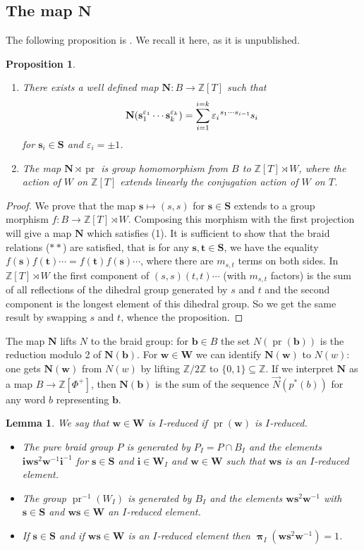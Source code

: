 \documentclass{amsart}
\numberwithin{equation}{section}
\newtheorem{lemma}[equation]{Lemma}
\newtheorem{proposition}[equation]{Proposition}
\newcommand\vN{\vec N}
\newcommand\lexp[2]{\kern\scriptspace\vphantom{#2}^{#1}\kern-\scriptspace#2}
\newcommand\inv{^{-1}}
\newcommand\bb{{\mathbf b}}
\newcommand\bi{{\mathbf i}}
\newcommand\bs{{\mathbf s}}
\newcommand\bt{{\mathbf t}}
\newcommand\bw{{\mathbf w}}
\newcommand\bN{{\mathbf N}}
\newcommand\bS{{\mathbf S}}
\newcommand\bW{{\mathbf W}}
\newcommand\BZ{{\mathbb Z}}
\DeclareMathOperator\pr{pr}
\DeclareMathOperator\bpi{\boldsymbol\pi}
\begin{document}
\subsection*{The map $\bN$}
The following proposition is \cite[Proposition~2.1]{digne}. We recall it here,  as it is unpublished.
\begin{proposition}\label{digne2.1}
\phantom{a}
\begin{enumerate}
\item There exists a well defined map \index{N@$\bN$} $\bN:B\to \BZ[T]$ such that
$$\bN(\bs_1^{\varepsilon_1}\cdots \bs_k^{\varepsilon_k})=\sum_{i=1}^{i=k} \varepsilon_i
\lexp{s_1\cdots s_{i-1}}s_i$$
for $\bs_i\in\bS$ and $\varepsilon_i=\pm1$.
\item The map $\bN\rtimes\pr$ is group homomorphism from $B$ to
$\BZ[T]\rtimes W$, where the action of $W$ on $\BZ[T]$
extends linearly the conjugation action of $W$ on $T$.
\end{enumerate}
\end{proposition}
\begin{proof}
We prove that the map $\bs\mapsto (s,s)$ for $\bs\in\bS$ extends to 
a group morphism $f:B\to \BZ[T]\rtimes W$.
Composing this morphism with the first projection will give a map $\bN$ which satisfies
(1). It is sufficient to show that the braid relations ($**$) are satisfied, that is for any
$\bs,\bt\in\bS$, we have the equality $f(\bs)f(\bt)\cdots=f(\bt)f(\bs)\cdots$, where there
are $m_{s,t}$ terms on both sides. In $\BZ[T]\rtimes W$ the first component of
$(s,s)(t,t)\cdots$ (with $m_{s,t}$ factors) is the sum of all reflections of the dihedral
group generated by $s$ and $t$ and the second component is the longest element of this
dihedral group. So we get the same result by swapping $s$ and $t$, whence the
proposition.
\end{proof}
The map $\bN$ lifts $N$ to the braid group:
for $\bb\in B$ the set $N(\pr(\bb))$
is the reduction modulo 2 of $\bN(\bb)$.
For $\bw\in\bW$ we can
identify $\bN(\bw)$ to $N(w)$:
one gets $\bN(\bw)$ from $N(w)$ by lifting $\BZ/2\BZ$ to $\{0,1\}\subseteq\BZ$.
If we interpret $\bN$ as a map $B\to
\BZ[\Phi^+]$, then $\bN(\bb)$ is the sum of the sequence $\vN(p^*(b))$ for any word
$b$ representing $\bb$.
\begin{lemma}\label{generators}We say that $\bw\in \bW$ is $I$-reduced if $\pr(\bw)$ is $I$-reduced.
\begin{itemize}
\item The pure braid group $P$ is generated by $P_I=P\cap B_I$ and
the elements $\bi\bw\bs^2\bw\inv\bi\inv$  for $\bs\in\bS$ and
$\bi\in \bW_I$ and $\bw\in\bW$ such that $\bw\bs$ is an $I$-reduced element.
\item The group $\pr\inv(W_I)$ is
generated by $B_I$ and the elements $\bw\bs^2\bw\inv$ with $\bs\in\bS$ and 
$\bw\bs\in\bW$ an $I$-reduced element.
\item If  $\bs\in\bS$ and if $\bw\bs\in\bW$ is an $I$-reduced element then
$\bpi_I(\bw\bs^2\bw\inv)=1$.
\end{itemize}
\end{lemma}
\end{document}
